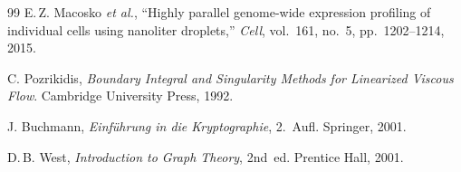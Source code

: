 ﻿\documentclass[a4paper,12pt]{scrreprt}
\theoremstyle{definition}
\begin{document}
\begin{thebibliography}{99}
 E.\,Z. Macosko \textit{et al.},
  ``Highly parallel genome-wide expression profiling of individual cells
  using nanoliter droplets,''
  \textit{Cell}, vol.~161, no.~5, pp.~1202--1214, 2015.

 C. Pozrikidis,
  \textit{Boundary Integral and Singularity Methods for Linearized
  Viscous Flow}.
  Cambridge University Press, 1992.

 J. Buchmann,
  \textit{Einführung in die Kryptographie}, 2.~Aufl.
  Springer, 2001.

 D.\,B. West,
  \textit{Introduction to Graph Theory}, 2nd~ed.
  Prentice Hall, 2001.
\end{thebibliography}
\endgroup
\end{document}

